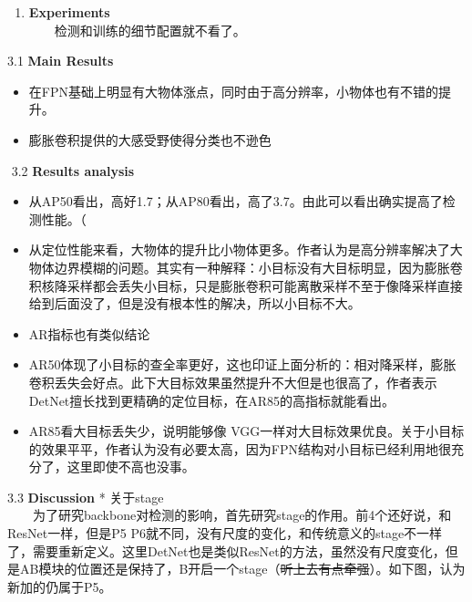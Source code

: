\begin{enumerate}
\def\labelenumi{\arabic{enumi}.}
\setcounter{enumi}{2}
\item
  \textbf{Experiments}\\
    检测和训练的细节配置就不看了。
\end{enumerate}

3.1 \textbf{Main Results}

\begin{figure}
\centering
\caption{}
\end{figure}

\begin{itemize}
\item
  在FPN基础上明显有大物体涨点，同时由于高分辨率，小物体也有不错的提升。
\item
  膨胀卷积提供的大感受野使得分类也不逊色
\end{itemize}

​ 3.2 \textbf{Results analysis} %

\begin{itemize}
\item
  从AP50看出，高好1.7；从AP80看出，高了3.7。由此可以看出确实提高了检测性能。（
\item
  从定位性能来看，大物体的提升比小物体更多。作者认为是高分辨率解决了大物体边界模糊的问题。其实有一种解释：小目标没有大目标明显，因为膨胀卷积核降采样都会丢失小目标，只是膨胀卷积可能离散采样不至于像降采样直接给到后面没了，但是没有根本性的解决，所以小目标不大。
\item
  AR指标也有类似结论
\item
  AR50体现了小目标的查全率更好，这也印证上面分析的：相对降采样，膨胀卷积丢失会好点。此下大目标效果虽然提升不大但是也很高了，作者表示DetNet擅长找到更精确的定位目标，在AR85的高指标就能看出。
\item
  AR85看大目标丢失少，说明能够像
  VGG一样对大目标效果优良。关于小目标的效果平平，作者认为没有必要太高，因为FPN结构对小目标已经利用地很充分了，这里即使不高也没事。
\end{itemize}

3.3 \textbf{Discussion} * 关于stage\\
  为了研究backbone对检测的影响，首先研究stage的作用。前4个还好说，和ResNet一样，但是P5
P6就不同，没有尺度的变化，和传统意义的stage不一样了，需要重新定义。这里DetNet也是类似ResNet的方法，虽然没有尺度变化，但是AB模块的位置还是保持了，B开启一个stage（\sout{听上去有点牵强}）。如下图，认为新加的仍属于P5。

